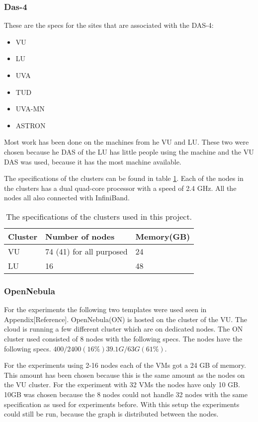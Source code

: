 \subsubsection{Das-4}
These are the specs for the sites that are associated with the DAS-4:

\begin{itemize}
\item VU
\item LU
\item UVA
\item TUD
\item UVA-MN
\item ASTRON
\end{itemize}
Most work has been done on the machines from he VU and LU. These two were chosen because he DAS of the LU has little people using the machine and the VU DAS was used, because it has the most machine available.

The specifications of the clusters can be found in table \ref{tab:das-clusters}. Each of the nodes in the clusters has a dual quad-core processor with a speed of 2.4 GHz. All the nodes all also connected with InfiniBand\cite{infiniband}.
\begin{table}[H]
\begin{tabular}{|l|l|l|}
\hline
Cluster & Number of nodes  & Memory(GB) \\ \hline
VU 		& 74 (41) for all purposed	 & 24			\\ \hline
LU		& 16 & 48 \\ \hline
\end{tabular}
\caption{The specifications of the clusters used in this project.}
\label{tab:das-clusters}
\end{table}


\subsubsection{OpenNebula}
For the experiments the following two templates were used seen in Appendix[Reference].
OpenNebula(ON) is hosted on the cluster of the VU. The cloud is running a few different cluster which are on dedicated nodes. The ON cluster used consisted of 8 nodes with the following specs. The nodes have the following specs. $400 / 2400 (16\%)  39.1G / 63G (61\%)$. 


For the experiments using 2-16 nodes each of the VMs got a 24 GB of memory. This amount has been chosen because this is the same amount as the nodes on the VU cluster. For the experiment with 32 VMs the nodes have only 10 GB. 10GB was chosen because the 8 nodes could not handle 32 nodes with the same specification as used for experiments before. With this setup the experiments could still be run, because the graph is distributed between the nodes. 

